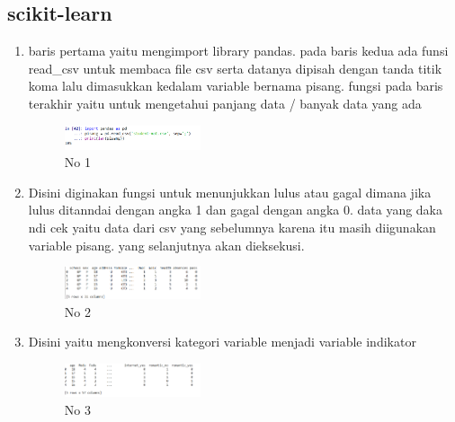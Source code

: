     \subsection{scikit-learn}
        \begin{enumerate}
            \item  baris pertama yaitu mengimport library pandas. pada baris kedua ada funsi read\_csv untuk membaca file csv  serta datanya dipisah dengan tanda titik koma lalu dimasukkan kedalam variable bernama pisang. fungsi pada baris terakhir yaitu untuk mengetahui panjang data / banyak data yang ada\hfill \break 
            \begin{figure}[H]
                \includegraphics[width=4cm]{figures/1174040/chapter2/1.png}
                \centering
                \caption{No 1}
            \end{figure}

            \item Disini diginakan fungsi untuk menunjukkan lulus atau gagal dimana jika lulus ditanndai dengan angka 1 dan gagal dengan angka 0. data yang daka ndi cek yaitu data dari csv yang sebelumnya karena itu masih diigunakan variable pisang. yang selanjutnya akan dieksekusi.
            \hfill \break 
            \begin{figure}[H]
                \includegraphics[width=4cm]{figures/1174040/chapter2/2.png}
                \centering
                \caption{No 2}
            \end{figure}

            \item Disini yaitu mengkonversi kategori variable menjadi variable indikator
            \hfill \break 
            \begin{figure}[H]
                \includegraphics[width=4cm]{figures/1174040/chapter2/3.png}
                \centering
                \caption{No 3}
            \end{figure}


\end{enumerate}
